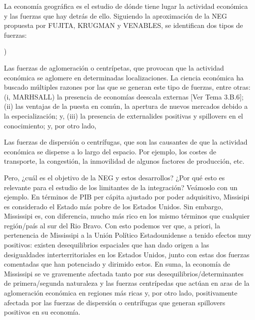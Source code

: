 \documentclass[10pt,a4paper]{article}
\newcounter{alphaitem}
\newenvironment{la}
      {\begin{list}{\alph{alphaitem})}{%
          \usecounter{alphaitem}%
          \setlength{\leftmargin}{1cm}%
          \setlength{\parskip}{3pt}%
          \setlength{\itemsep}{0pt}%
          \setlength{\parsep}{0pt}%
      }}
      {\end{list}}
\newcommand{\authorfont}[1]{{\fontfamily{EBGaramond-TLF}\selectfont #1}}
\begin{document}
La economía geográfica es el estudio de dónde tiene lugar la actividad económica y las fuerzas que hay detrás de ello. Siguiendo la aproximación de la NEG propuesta por FUJITA, KRUGMAN y VENABLES, se identifican dos tipos de fuerzas:
\begin{la}
    \item Las fuerzas de aglomeración o centrípetas, que provocan que la actividad económica se aglomere en determinadas localizaciones. La ciencia económica ha buscado múltiples razones por las que se generan este tipo de fuerzas, entre otras: (i, MARHSALL) la presencia de economías deescala externas [\authorfont{Ver Tema 3.B.6}]; (ii) las ventajas de la puesta en común, la apertura de nuevos mercados debido a la especialización; y, (iii) la presencia de externalides positivas y spillovers en el conocimiento; y, por otro lado,
    \item Las fuerzas de dispersión o centrífugas, que son las causantes de que la actividad económica se disperse a lo largo del espacio. Por ejemplo, los costes de transporte, la congestión, la inmovilidad de algunos factores de producción, etc.
\end{la} 

Pero, ¿cuál es el objetivo de la NEG y estos desarrollos? ¿Por qué esto es relevante para el estudio de los limitantes de la integración? Veámoslo con un ejemplo. En términos de PIB per cápita ajustado por poder adquisitivo, Missisipi es considerado el Estado más pobre de los Estados Unidos. Sin embargo, Mississipi es, con diferencia, mucho más rico en los mismo términos que cualquier región/país al sur del Rio Bravo. Con esto podemos ver que, a priori, la pertenencia de Mississipi a la Unión Político Estadounidense a tenido efectos muy positivos: existen desequilibrios espaciales que han dado origen a las desigualdades interterritoriales en los Estados Unidos, junto con estas dos fuerzas comentadas que han potenciado y dirimido estos. En suma, la economía de Mississipi se ve gravemente afectada tanto por sus desequilibrios/determinantes de primera/segunda naturaleza y las fuerzas centrípedas que actúan en aras de la aglomeración económica en regiones más ricas y, por otro lado, positivamente afectada por las fuerzas de dispersión o centrífugas que generan spillovers positivos en su economía. 
\end{document}

